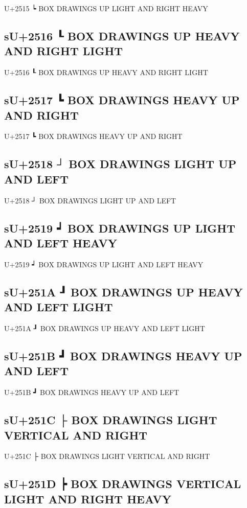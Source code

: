 U+2515 ┕ BOX DRAWINGS UP LIGHT AND RIGHT HEAVY

\subsection{sU+2516 ┖ BOX DRAWINGS UP HEAVY AND RIGHT LIGHT}

U+2516 ┖ BOX DRAWINGS UP HEAVY AND RIGHT LIGHT

\subsection{sU+2517 ┗ BOX DRAWINGS HEAVY UP AND RIGHT}

U+2517 ┗ BOX DRAWINGS HEAVY UP AND RIGHT

\subsection{sU+2518 ┘ BOX DRAWINGS LIGHT UP AND LEFT}

U+2518 ┘ BOX DRAWINGS LIGHT UP AND LEFT

\subsection{sU+2519 ┙ BOX DRAWINGS UP LIGHT AND LEFT HEAVY}

U+2519 ┙ BOX DRAWINGS UP LIGHT AND LEFT HEAVY

\subsection{sU+251A ┚ BOX DRAWINGS UP HEAVY AND LEFT LIGHT}

U+251A ┚ BOX DRAWINGS UP HEAVY AND LEFT LIGHT

\subsection{sU+251B ┛ BOX DRAWINGS HEAVY UP AND LEFT}

U+251B ┛ BOX DRAWINGS HEAVY UP AND LEFT

\subsection{sU+251C ├ BOX DRAWINGS LIGHT VERTICAL AND RIGHT}

U+251C ├ BOX DRAWINGS LIGHT VERTICAL AND RIGHT

\subsection{sU+251D ┝ BOX DRAWINGS VERTICAL LIGHT AND RIGHT HEAVY}

